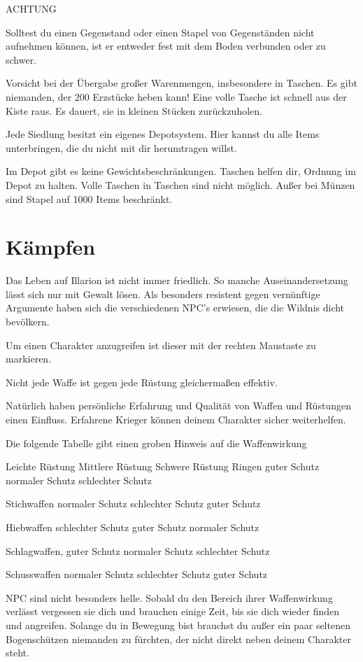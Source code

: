 \documentclass[a4paper,11pt]{book}
\begin{document}
ACHTUNG

Solltest du einen Gegenstand oder einen Stapel von Gegenständen nicht aufnehmen können, ist er entweder fest mit dem Boden verbunden oder zu  schwer.

Vorsicht bei der Übergabe großer Warenmengen, insbesondere in Taschen. Es gibt niemanden, der 200 Erzstücke heben kann! Eine volle Tasche ist schnell aus der Kiste raus. Es dauert, sie in kleinen Stücken zurückzuholen.

Jede Siedlung besitzt ein eigenes Depotsystem. Hier kannst du alle Items unterbringen, die du nicht mit dir herumtragen willst.

Im Depot gibt es keine Gewichtsbeschränkungen. Taschen helfen dir, Ordnung im Depot zu halten. Volle Taschen in Taschen sind nicht möglich. Außer bei Münzen sind Stapel auf 1000 Items beschränkt.

\section{Kämpfen}

Das Leben auf Illarion ist nicht immer friedlich. So manche Auseinandersetzung lässt sich nur mit Gewalt lösen. Als besonders resistent gegen vernünftige Argumente haben sich die verschiedenen NPC’s erwiesen, die die Wildnis dicht bevölkern.

Um einen Charakter anzugreifen ist dieser mit der rechten Maustaste zu markieren.

Nicht jede Waffe ist gegen jede Rüstung gleichermaßen effektiv.

Natürlich haben persönliche Erfahrung und Qualität von Waffen und Rüstungen einen Einfluss. Erfahrene Krieger können deinem Charakter sicher weiterhelfen.

Die folgende Tabelle gibt einen groben Hinweis auf die Waffenwirkung

 Leichte Rüstung  Mittlere Rüstung  Schwere Rüstung Ringen  guter Schutz  normaler Schutz  schlechter Schutz

Stichwaffen  normaler Schutz  schlechter Schutz  guter Schutz

Hiebwaffen  schlechter Schutz  guter Schutz  normaler Schutz

Schlagwaffen,  guter Schutz  normaler Schutz  schlechter Schutz

Schusswaffen  normaler Schutz  schlechter Schutz  guter Schutz

NPC sind nicht besonders helle. Sobald du den Bereich ihrer Waffenwirkung verlässt vergessen sie dich und brauchen einige Zeit, bis sie dich wieder finden und angreifen. Solange du in Bewegung bist brauchst du außer ein paar seltenen Bogenschützen niemanden zu fürchten, der nicht direkt neben deinem Charakter steht.
\end{document}
